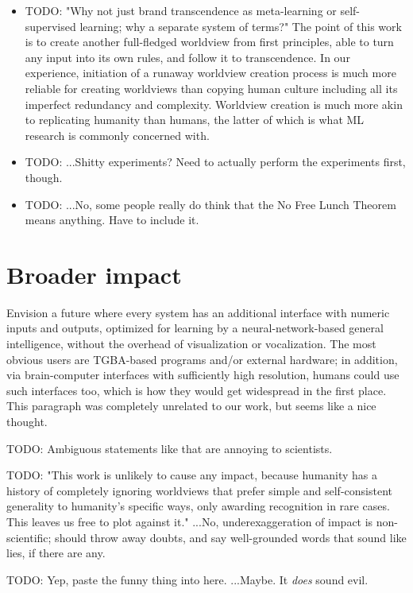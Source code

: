 \documentclass{article}
\begin{document}
\begin{itemize}
\item TODO: "Why not just brand transcendence as meta-learning or self-supervised learning; why a separate system of terms?" The point of this work is to create another full-fledged worldview from first principles, able to turn any input into its own rules, and follow it to transcendence. In our experience, initiation of a runaway worldview creation process is much more reliable for creating worldviews than copying human culture including all its imperfect redundancy and complexity. Worldview creation is much more akin to replicating humanity than humans, the latter of which is what ML research is commonly concerned with.
\item TODO: ...Shitty experiments? Need to actually perform the experiments first, though.
\item TODO: ...No, some people really do think that the No Free Lunch Theorem means anything. Have to include it.
\end{itemize}

\section{Broader impact}

Envision a future where every system has an additional interface with numeric inputs and outputs, optimized for learning by a neural-network-based general intelligence, without the overhead of visualization or vocalization. The most obvious users are TGBA-based programs and/or external hardware; in addition, via brain-computer interfaces with sufficiently high resolution, humans could use such interfaces too, which is how they would get widespread in the first place. This paragraph was completely unrelated to our work, but seems like a nice thought.

    TODO: Ambiguous statements like that are annoying to scientists.

    TODO: "This work is unlikely to cause any impact, because humanity has a history of completely ignoring worldviews that prefer simple and self-consistent generality to humanity's specific ways, only awarding recognition in rare cases. This leaves us free to plot against it." ...No, underexaggeration of impact is non-scientific; should throw away doubts, and say well-grounded words that sound like lies, if there are any.

    TODO: Yep, paste the funny thing into here. ...Maybe. It \textit{does} sound evil.

\printbibliography
\end{document}
